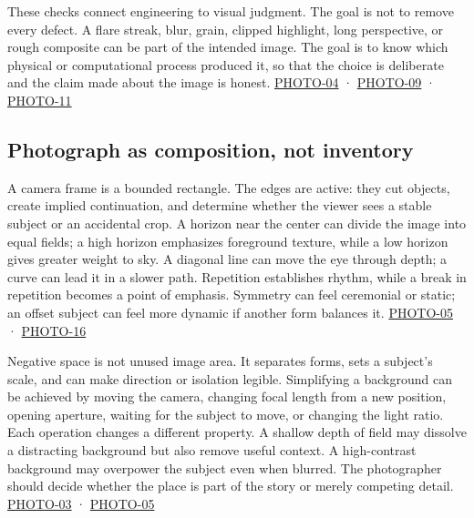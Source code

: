 These checks connect engineering to visual judgment. The goal is not to remove every defect. A flare streak, blur, grain, clipped highlight, long perspective, or rough composite can be part of the intended image. The goal is to know which physical or computational process produced it, so that the choice is deliberate and the claim made about the image is honest. \hyperref[04-visual-computing-ii-ch036-photo-04---photography-session-04]{PHOTO-04} · \hyperref[04-visual-computing-ii-ch036-photo-09---photography-session-09]{PHOTO-09} · \hyperref[04-visual-computing-ii-ch036-photo-11---photography-session-11]{PHOTO-11}

\subsection{Photograph as composition, not inventory}\label{04-visual-computing-ii-ch034-photograph-as-composition-not-inventory}

A camera frame is a bounded rectangle. The edges are active: they cut objects, create implied continuation, and determine whether the viewer sees a stable subject or an accidental crop. A horizon near the center can divide the image into equal fields; a high horizon emphasizes foreground texture, while a low horizon gives greater weight to sky. A diagonal line can move the eye through depth; a curve can lead it in a slower path. Repetition establishes rhythm, while a break in repetition becomes a point of emphasis. Symmetry can feel ceremonial or static; an offset subject can feel more dynamic if another form balances it. \hyperref[04-visual-computing-ii-ch036-photo-05---photography-session-05]{PHOTO-05} · \hyperref[04-visual-computing-ii-ch036-photo-16---photography-session-16]{PHOTO-16}

Negative space is not unused image area. It separates forms, sets a subject's scale, and can make direction or isolation legible. Simplifying a background can be achieved by moving the camera, changing focal length from a new position, opening aperture, waiting for the subject to move, or changing the light ratio. Each operation changes a different property. A shallow depth of field may dissolve a distracting background but also remove useful context. A high-contrast background may overpower the subject even when blurred. The photographer should decide whether the place is part of the story or merely competing detail. \hyperref[04-visual-computing-ii-ch036-photo-03---photography-session-03]{PHOTO-03} · \hyperref[04-visual-computing-ii-ch036-photo-05---photography-session-05]{PHOTO-05}

